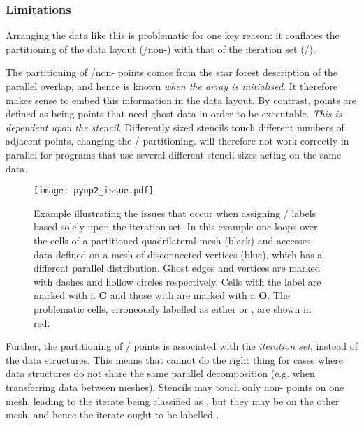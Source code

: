 \documentclass[thesis]{subfiles}
\begin{document}
\subsubsection{Limitations}
\label{sec:pyop2_parallel_limitation}

Arranging the data like this is problematic for one key reason: it conflates the partitioning of the data layout (\ghostiter{}/non-\ghostiter{}) with that of the iteration set (\coreiter{}/\ownediter{}).

The partitioning of \ghostiter{}/non-\ghostiter{} points comes from the star forest description of the parallel overlap, and hence is known \emph{when the array is initialised}.
It therefore makes sense to embed this information in the data layout.
By contrast, \ownediter{} points are defined as being points that need ghost data in order to be executable.
\emph{This is dependent upon the stencil}.
Differently sized stencils touch different numbers of adjacent points, changing the \coreiter{}/\ownediter{} partitioning.
 will therefore not work correctly in parallel for programs that use several different stencil sizes acting on the same data.

\begin{figure}
  \centering
  \texttt{[image: pyop2\_issue.pdf]}
  \caption{
    Example illustrating the issues that occur when assigning \coreiter{}/\ownediter{} labels based solely upon the iteration set.
    In this example one loops over the cells of a partitioned quadrilateral mesh (black) and accesses data defined on a mesh of disconnected vertices (blue), which has a different parallel distribution.
    Ghost edges and vertices are marked with dashes and hollow circles respectively.
    Cells with the label \coreiter{} are marked with a \textbf{C} and those with \ownediter{} are marked with a \textbf{O}.
    The problematic cells, erroneously labelled as either \coreiter{} or \ownediter{}, are shown in red.
  }
  \label{fig:pyop2_issue}
\end{figure}

Further, the partitioning of \coreiter{}/\ownediter{} points is associated with the \emph{iteration set}, instead of the data structures.
This means that  cannot do the right thing for cases where data structures do not share the same parallel decomposition (e.g. when transferring data between meshes).
Stencils may touch only non-\ghostiter{} points on one mesh, leading to the iterate being classified as \coreiter{}, but they may be \ghostiter{} on the other mesh, and hence the iterate ought to be labelled \ownediter{}.
\end{document}
